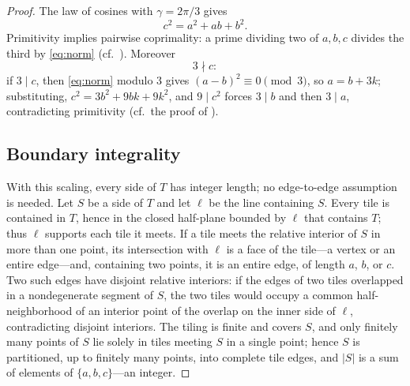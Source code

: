 \documentclass[11pt]{amsart}
\theoremstyle{remark}
\begin{document}
\begin{proof}
The law of cosines with $\gamma=2\pi/3$ gives
\begin{equation}\label{eq:norm}
c^2=a^2+ab+b^2 .
\end{equation}
Primitivity implies pairwise coprimality: a prime dividing two of $a,b,c$ divides the third by \eqref{eq:norm} (cf.\ \cite[Lemma~5]{BeesonPrime}). Moreover
\begin{equation}\label{eq:not3}
3\nmid c :
\end{equation}
if $3\mid c$, then \eqref{eq:norm} modulo $3$ gives $(a-b)^2\equiv 0\pmod 3$, so $a=b+3k$; substituting, $c^2=3b^2+9bk+9k^2$, and $9\mid c^2$ forces $3\mid b$ and then $3\mid a$, contradicting primitivity (cf.\ the proof of \cite[Theorem~6]{BeesonPrime}).

\subsection*{Boundary integrality}
With this scaling, every side of $T$ has integer length; no edge-to-edge assumption is needed. Let $S$ be a side of $T$ and let $\ell$ be the line containing $S$. Every tile is contained in $T$, hence in the closed half-plane bounded by $\ell$ that contains $T$; thus $\ell$ supports each tile it meets. If a tile meets the relative interior of $S$ in more than one point, its intersection with $\ell$ is a face of the tile---a vertex or an entire edge---and, containing two points, it is an entire edge, of length $a$, $b$, or $c$. Two such edges have disjoint relative interiors: if the edges of two tiles overlapped in a nondegenerate segment of $S$, the two tiles would occupy a common half-neighborhood of an interior point of the overlap on the inner side of $\ell$, contradicting disjoint interiors. The tiling is finite and covers $S$, and only finitely many points of $S$ lie solely in tiles meeting $S$ in a single point; hence $S$ is partitioned, up to finitely many points, into complete tile edges, and $|S|$ is a sum of elements of $\{a,b,c\}$---an integer.


\end{proof}
\end{document}
